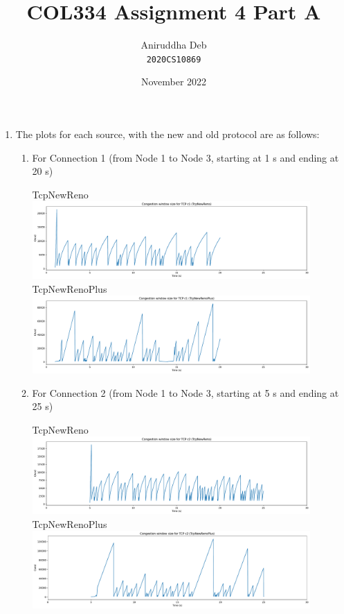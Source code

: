 \documentclass[12pt]{article}
\title{\textbf{COL334 Assignment 4 Part A}}
\author{Aniruddha Deb \\ \texttt{2020CS10869}}
\date{November 2022}
\begin{document}
\maketitle

\begin{enumerate}
    \item The plots for each source, with the new and old protocol are as follows:

    \begin{enumerate}[label=(\roman*)]
        \item For Connection 1 (from Node 1 to Node 3, starting at 1 s and ending at 
            20 s)
        \begin{center}
            TcpNewReno
            \includegraphics[width=0.88\textwidth]{../Q1/cwnd_plot_c1_TcpNewReno.pdf}
            TcpNewRenoPlus
            \includegraphics[width=0.88\textwidth]{../Q1/cwnd_plot_c1_TcpNewRenoPlus.pdf}
        \end{center}
        \item For Connection 2 (from Node 1 to Node 3, starting at 5 s and ending at
            25 s)
        \begin{center}
            TcpNewReno
            \includegraphics[width=0.88\textwidth]{../Q1/cwnd_plot_c2_TcpNewReno.pdf}
            TcpNewRenoPlus
            \includegraphics[width=0.88\textwidth]{../Q1/cwnd_plot_c2_TcpNewRenoPlus.pdf}

\end{center}
\end{enumerate}
\end{enumerate}
\end{document}
